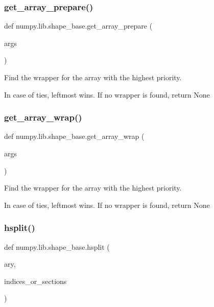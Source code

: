 \subsubsection{\texorpdfstring{get\+\_\+array\+\_\+prepare()}{get\_array\_prepare()}}
{\footnotesize\ttfamily def numpy.\+lib.\+shape\+\_\+base.\+get\+\_\+array\+\_\+prepare (\begin{DoxyParamCaption}\item[{}]{args }\end{DoxyParamCaption})}

\begin{DoxyVerb}Find the wrapper for the array with the highest priority.

In case of ties, leftmost wins. If no wrapper is found, return None
\end{DoxyVerb}
 \mbox{\label{namespacenumpy_1_1lib_1_1shape__base_a56de37acb0e84e4c44c5d9eb2503ae1a}} 
\subsubsection{\texorpdfstring{get\+\_\+array\+\_\+wrap()}{get\_array\_wrap()}}
{\footnotesize\ttfamily def numpy.\+lib.\+shape\+\_\+base.\+get\+\_\+array\+\_\+wrap (\begin{DoxyParamCaption}\item[{}]{args }\end{DoxyParamCaption})}

\begin{DoxyVerb}Find the wrapper for the array with the highest priority.

In case of ties, leftmost wins. If no wrapper is found, return None
\end{DoxyVerb}
 \mbox{\label{namespacenumpy_1_1lib_1_1shape__base_a92089da3ec9c284aae7450f6fc98b701}} 
\subsubsection{\texorpdfstring{hsplit()}{hsplit()}}
{\footnotesize\ttfamily def numpy.\+lib.\+shape\+\_\+base.\+hsplit (\begin{DoxyParamCaption}\item[{}]{ary,  }\item[{}]{indices\+\_\+or\+\_\+sections }\end{DoxyParamCaption})}

